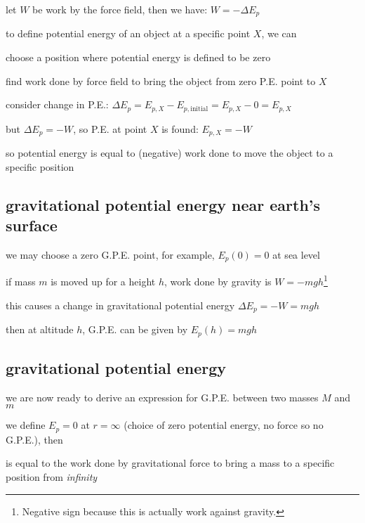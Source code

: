 let $W$ be work by the force field, then we have: $\boxed{W=-\Delta E_p}$

\newpage

to define potential energy of an object at a specific point $X$, we can

\begin{compactenum}
	\item[(1)] choose a position where potential energy is defined to be zero
	
	\item[(2)] find work done by force field to bring the object from zero P.E. point to $X$
	
	\item[(3)] consider change in P.E.: $\Delta E_p = E_{p,X} - E_{p,\text{initial}} = E_{p,X} - 0 = E_{p,X}$
	
	but $\Delta E_p = -W$, so P.E. at point $X$ is found: $E_{p,X} = -W$
	
\end{compactenum}

so potential energy is equal to (negative) work done to move the object to a specific position

\subsection*{gravitational potential energy near earth's surface}

we may choose a zero G.P.E. point, for example, $E_p(0) = 0$ at sea level

if mass $m$ is moved up for a height $h$, work done by gravity is $W=-mgh$\footnote{Negative sign because this is actually work against gravity.}

this causes a change in gravitational potential energy $\Delta E_p=-W=mg h$

then at altitude $h$, G.P.E. can be given by $E_p(h)=mgh$

\subsection{gravitational potential energy}


we are now ready to derive an expression for G.P.E. between two masses $M$ and $m$

we define $E_p=0$ at $r=\infty$ (choice of zero potential energy, no force so no G.P.E.), then

\begin{ilight}
	 is equal to the work done by gravitational force to bring a mass to a specific position from \emph{infinity}
\end{ilight} 

